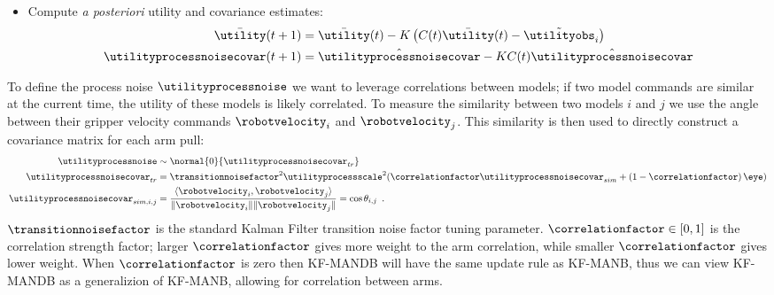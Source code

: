 \begin{algorithm}[t]
\begin{algorithmic}
{\begin{enumerate}
{\begin{itemize}
{\begin{align*}
                                    S                                &= C(t) \hat \utilityprocessnoisecovar C(t)^T + \observationnoisefactor^2 \\
                                    K                                &= \hat \utilityprocessnoisecovar C(t)^T S^{-1}
                                \end{align*}
                            }
                            \item{Compute \textit{a posteriori} utility and covariance estimates:
                                \begin{align*}
                                    \bar \utility(t + 1)             &= \bar \utility(t) - K \left( C(t) \bar \utility(t) - \tilde \utilityobs_i \right) \\
                                    \utilityprocessnoisecovar(t + 1) &= \hat \utilityprocessnoisecovar - K C(t) \hat \utilityprocessnoisecovar
                                \end{align*}
                            }
                        \end{itemize}
                    }
                \end{enumerate}
            }
        \EndFor
    \end{algorithmic}
\end{algorithm}

To define the process noise $\utilityprocessnoise$ we want to leverage correlations between models; if two model commands are similar at the current time, the utility of these models is likely correlated. To measure the similarity between two models $i$ and $j$ we use the angle between their gripper velocity commands $\robotvelocity_{i}$ and $\robotvelocity_{j}$. This similarity is then used to directly construct a covariance matrix for each arm pull:
{\begin{equation}
\begin{split}
    \utilityprocessnoise            &\sim \normal{0}{\utilityprocessnoisecovar_{tr}}\\
    \utilityprocessnoisecovar_{tr}  & = \transitionnoisefactor^2 \utilityprocessscale^2 (\correlationfactor \utilityprocessnoisecovar_{sim} + \left(1 - \correlationfactor\right) \eye)\\
    \utilityprocessnoisecovar_{sim,i,j} & = \frac{\langle \robotvelocity_{i}, \robotvelocity_{j} \rangle}{\| \robotvelocity_{i} \| \| \robotvelocity_{j} \|} = \cos \theta_{i,j} \enspace.
\label{eqn:processnoise}
\end{split}
\end{equation}}
$\transitionnoisefactor$ is the standard Kalman Filter transition noise factor tuning parameter. $\correlationfactor \in [0,1]$ is the correlation strength factor; larger $\correlationfactor$ gives more weight to the arm correlation, while smaller $\correlationfactor$ gives lower weight. When $\correlationfactor$ is zero then KF-MANDB will have the same update rule as KF-MANB, thus we can view KF-MANDB as a generalizion of KF-MANB, allowing for correlation between arms.

